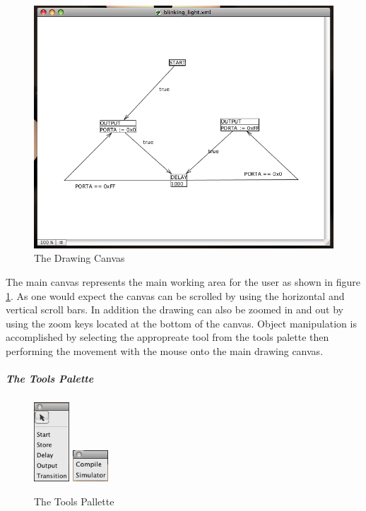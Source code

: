 \begin{figure}[htp]
    \centering
    \includegraphics[width=\imgmedium]{./images/plcedit_canvas.png}
    \caption{The Drawing Canvas}
    \label{fig:plcedit_canvas}
\end{figure}

The main canvas represents the main working area for the user as shown in figure \ref{fig:plcedit_canvas}. As one would expect the canvas can be scrolled by using the horizontal and vertical scroll bars. In addition the drawing can also be zoomed in and out by using the zoom keys located at the bottom of the canvas. Object manipulation is accomplished by selecting the appropreate tool from the tools palette then performing the movement with the mouse onto the main drawing canvas.

\subparagraph{The Tools Palette}

\begin{figure}[htp]
    \centering
    \includegraphics[width=50px]{./images/plcedit_tools.png}
    \includegraphics[width=50px]{./images/plcedit_actions.png}
    \caption{The Tools Pallette}
    \label{fig:plcedit_tools}
\end{figure}

